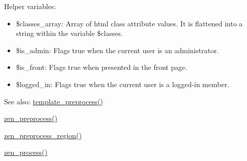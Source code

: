 Helper variables:\begin{itemize}
\item \$classes\_\-array: Array of html class attribute values. It is flattened into a string within the variable \$classes.\item \$is\_\-admin: Flags true when the current user is an administrator.\item \$is\_\-front: Flags true when presented in the front page.\item \$logged\_\-in: Flags true when the current user is a logged-in member.\end{itemize}


\begin{Desc}
\item[See also:]\hyperlink{includes_2theme_8inc_3eeb7bcdba7ef4859f99586da264d347}{template\_\-preprocess()} 

\hyperlink{sites_2all_2themes_2zen_2template_8php_34cb06c8098f8e1c710c501bb9a64d8b}{zen\_\-preprocess()} 

\hyperlink{sites_2all_2themes_2zen_2template_8php_1fa9b7695fa6d89f176bb01c32ad837f}{zen\_\-preprocess\_\-region()} 

\hyperlink{sites_2all_2themes_2zen_2template_8php_3790b825810aa4bfd00c27c37817a7d8}{zen\_\-process()} \end{Desc}
